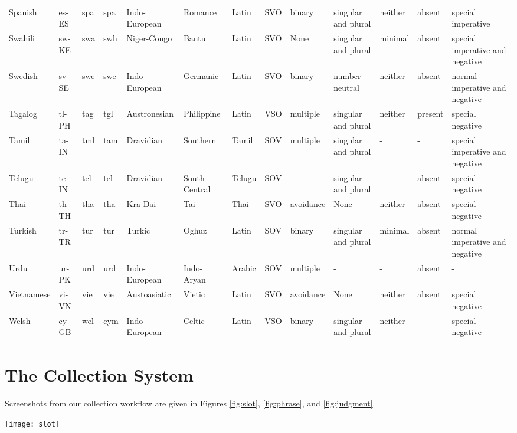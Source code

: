 \documentclass[11pt]{article}
\newcommand{\M}{\textsc{massive}}
\begin{document}
\begin{table*}[]
{\begin{tabular}{lllllllllllll}
Spanish & es-ES & spa & spa & Indo-European & Romance & Latin & SVO & binary & singular and plural & neither & absent & special imperative \\
Swahili & sw-KE & swa & swh & Niger-Congo & Bantu & Latin & SVO & None & singular and plural & minimal & absent & special imperative and negative \\
Swedish & sv-SE & swe & swe & Indo-European & Germanic & Latin & SVO & binary & number neutral & neither & absent & normal imperative and negative \\
Tagalog & tl-PH & tag & tgl & Austronesian & Philippine & Latin & VSO & multiple & singular and plural & neither & present & special negative \\
Tamil & ta-IN & tml & tam & Dravidian & Southern & Tamil & SOV & multiple & singular and plural & - & - & special imperative and negative \\
Telugu & te-IN & tel & tel & Dravidian & South-Central & Telugu & SOV & - & singular and plural & - & absent & special negative \\
Thai & th-TH & tha & tha & Kra-Dai & Tai & Thai & SVO & avoidance & None & neither & absent & special negative \\
Turkish & tr-TR & tur & tur & Turkic & Oghuz & Latin & SOV & binary & singular and plural & minimal & absent & normal imperative and negative \\
Urdu & ur-PK & urd & urd & Indo-European & Indo-Aryan & Arabic & SOV & multiple & - & - & absent & - \\
Vietnamese & vi-VN & vie & vie & Austoasiatic & Vietic & Latin & SVO & avoidance & None & neither & absent & special negative \\
Welsh & cy-GB & wel & cym & Indo-European & Celtic & Latin & VSO & binary & singular and plural & neither & - & special negative \\
\bottomrule
\end{tabular}
}
\caption{Additional linguistic characteristics of the \M{} languages.}
\label{tab:addl_ling_char}
\end{table*}

\section{The Collection System}
\label{sec:appendix}

Screenshots from our collection workflow are given in Figures \ref{fig:slot}, \ref{fig:phrase}, and \ref{fig:judgment}.

\begin{figure*}
  \centering \texttt{[image: slot]}
  \caption{Slot localization task as presented to Amazon MTurk worker.} \label{fig:slot}
\end{figure*}
\end{document}
